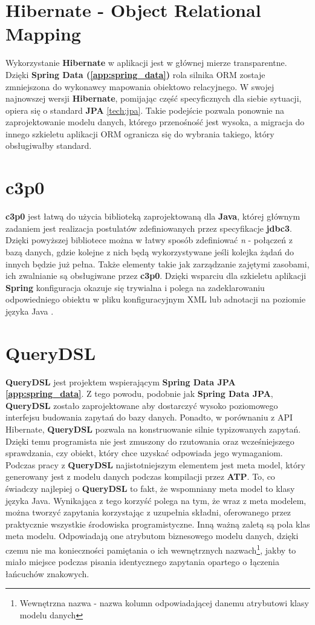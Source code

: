 \section{Hibernate - Object Relational Mapping}
\label{tech:hibernate}
	Wykorzystanie \textbf{Hibernate} w aplikacji jest w głównej mierze transparentne. Dzięki \textbf{Spring Data (\ref{app:spring_data})} rola silnika ORM zostaje zmniejszona do wykonawcy mapowania obiektowo relacyjnego. W swojej najnowszej wersji \textbf{Hibernate}, pomijając część specyficznych dla siebie sytuacji, opiera się o standard \textbf{JPA} \ref{tech:jpa}. Takie podejście pozwala ponownie na zaprojektowanie modelu danych, którego przenośność jest wysoka, a migracja do innego szkieletu aplikacji ORM ogranicza się do wybrania takiego, który obsługiwałby standard. 

\section{c3p0}
\label{tech:c3p0}
	\textbf{c3p0} jest łatwą do użycia biblioteką zaprojektowaną dla \textbf{Java}, której głównym zadaniem jest realizacja postulatów zdefiniowanych przez specyfikacje \textbf{jdbc3}. Dzięki powyższej bibliotece można w łatwy sposób zdefiniować \emph{n} - połączeń z bazą danych, gdzie kolejne z nich będą wykorzystywane jeśli kolejka żądań do innych będzie już pełna. Także elementy takie jak zarządzanie zajętymi zasobami, ich zwalnianie są obsługiwane przez \textbf{c3p0}. Dzięki wsparciu dla szkieletu aplikacji \textbf{Spring} konfiguracja okazuje się trywialna i polega na zadeklarowaniu odpowiedniego obiektu w pliku konfiguracyjnym XML lub adnotacji na poziomie języka Java \cite{c3p0}.
	
\section{QueryDSL}
\label{tech:queryDSL}
	\textbf{QueryDSL} jest projektem wspierającym \textbf{Spring Data JPA \ref{app:spring_data}}. Z tego powodu, podobnie jak \textbf{Spring Data JPA}, \textbf{QueryDSL} zostało zaprojektowane aby dostarczyć wysoko poziomowego interfejsu budowania zapytań do bazy danych. Ponadto, w porównaniu z API Hibernate, \textbf{QueryDSL} pozwala na konstruowanie silnie typizowanych zapytań. Dzięki temu programista nie jest zmuszony do rzutowania oraz wcześniejszego sprawdzania, czy obiekt, który chce uzyskać odpowiada jego wymaganiom. Podczas pracy z \textbf{QueryDSL} najistotniejszym elementem jest meta model, który generowany jest z modelu danych podczas kompilacji przez \textbf{ATP}. To, co świadczy najlepiej o \textbf{QueryDSL} to fakt, że wspomniany meta model to klasy języka Java. Wynikająca z tego korzyść polega na tym, że wraz z meta modelem, można tworzyć zapytania korzystając z uzupełnia składni, oferowanego przez praktycznie wszystkie środowiska programistyczne. Inną ważną zaletą są pola klas meta modelu. Odpowiadają one atrybutom biznesowego modelu danych, dzięki czemu nie ma konieczności pamiętania o ich wewnętrznych nazwach\footnote{Wewnętrzna nazwa - nazwa kolumn odpowiadającej danemu atrybutowi klasy modelu danych}, jakby to miało miejsce podczas pisania identycznego zapytania opartego o łączenia łańcuchów znakowych.
	
